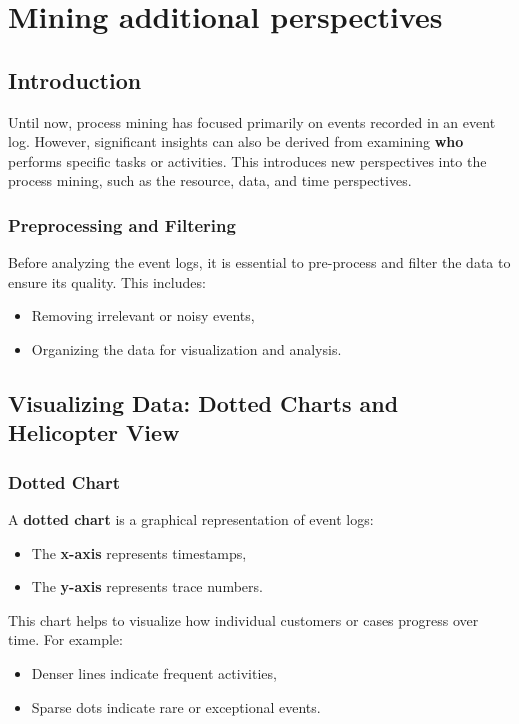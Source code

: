 \chapter{Mining additional perspectives}

\section{Introduction}

Until now, process mining has focused primarily on events recorded in an event log. However, significant insights can also be derived from examining \textbf{who} performs specific tasks or activities. This introduces new perspectives into the process mining, such as the resource, data, and time perspectives.

\subsection{Preprocessing and Filtering}
Before analyzing the event logs, it is essential to pre-process and filter the data to ensure its quality. This includes:
\begin{itemize}
    \item Removing irrelevant or noisy events,
    \item Organizing the data for visualization and analysis.
\end{itemize}

\section{Visualizing Data: Dotted Charts and Helicopter View}

\subsection{Dotted Chart}
A \textbf{dotted chart} is a graphical representation of event logs:
\begin{itemize}
    \item The \textbf{x-axis} represents timestamps,
    \item The \textbf{y-axis} represents trace numbers.
\end{itemize}

This chart helps to visualize how individual customers or cases progress over time. For example:
\begin{itemize}
    \item Denser lines indicate frequent activities,
    \item Sparse dots indicate rare or exceptional events.
\end{itemize}



